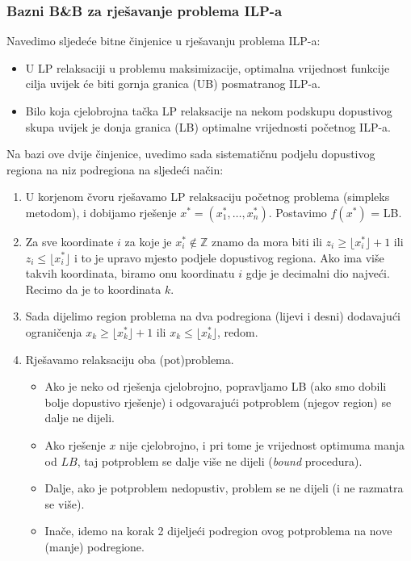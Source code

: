 \documentclass[a4paper, utf8, 11pt, colorlinks]{article}
\begin{document}
\subsubsection{Bazni B\&B za rješavanje problema ILP-a}

Navedimo sljedeće bitne činjenice u rješavanju problema  ILP-a:
\begin{itemize}
    \item  U LP relaksaciji u problemu 
           maksimizacije, optimalna vrijednost funkcije cilja 
           uvijek će biti gornja granica (UB) posmatranog ILP-a. 
    \item  Bilo koja cjelobrojna tačka LP relaksacije na nekom podskupu  
           dopustivog skupa uvijek je  donja granica (LB) optimalne vrijednosti početnog ILP-a. 
\end{itemize}
Na bazi ove dvije činjenice, uvedimo sada sistematičnu podjelu dopustivog regiona na niz podregiona na sljedeći način:
\begin{enumerate}
    \item U korjenom čvoru rješavamo LP relaksaciju početnog problema     (simpleks metodom), i dobijamo rješenje $x^*=(x^*_1, \ldots, x^*_n)$.   Postavimo $f(x^*)$ = LB.
    \item Za sve koordinate $i$ za koje je $x^*_i \not \in \mathbb{Z}$ znamo da  mora biti ili $z_i \geq \lfloor x^*_i \rfloor + 1$ ili $z_i \leq \lfloor x^*_i \rfloor$ i to je upravo mjesto podjele dopustivog regiona. Ako ima više takvih koordinata, biramo onu koordinatu $i$ gdje je decimalni dio najveći.  Recimo da je to koordinata $k$.
    \item Sada dijelimo region problema na dva podregiona (lijevi i desni) dodavajući 
          ograničenja $x_k \geq \lfloor x^*_k \rfloor + 1$ ili $x_k \leq \lfloor x^*_k \rfloor$, redom.
    \item Rješavamo relaksaciju oba (pot)problema. 
    \begin{itemize}
    	\item  Ako je neko od rješenja cjelobrojno, popravljamo LB (ako smo dobili bolje dopustivo rješenje) i odgovarajući potproblem (njegov region) se dalje ne dijeli. 
    	\item Ako rješenje $x$ nije cjelobrojno, i pri tome je vrijednost optimuma manja od $LB$, taj potproblem se dalje više ne dijeli (\emph{bound} procedura). 
    	\item Dalje, ako je potproblem nedopustiv, problem se ne dijeli (i ne razmatra se više). 
    	\item Inače, idemo na korak 2 dijeljeći podregion ovog potproblema na nove (manje) podregione.    
    \end{itemize}
\end{enumerate}
\end{document}

